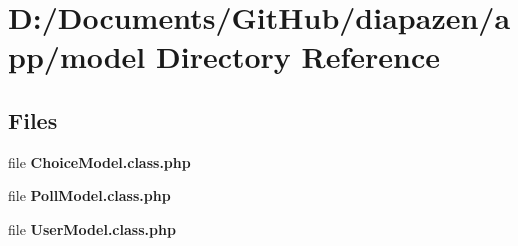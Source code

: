 \section{D\-:/\-Documents/\-Git\-Hub/diapazen/app/model Directory Reference}
\label{dir_4b9b69004c849e5fef4fdad012fd7a3c}
\subsection*{Files}
\begin{DoxyCompactItemize}
\item 
file {\bfseries Choice\-Model.\-class.\-php}
\item 
file {\bfseries Poll\-Model.\-class.\-php}
\item 
file {\bfseries User\-Model.\-class.\-php}
\end{DoxyCompactItemize}
